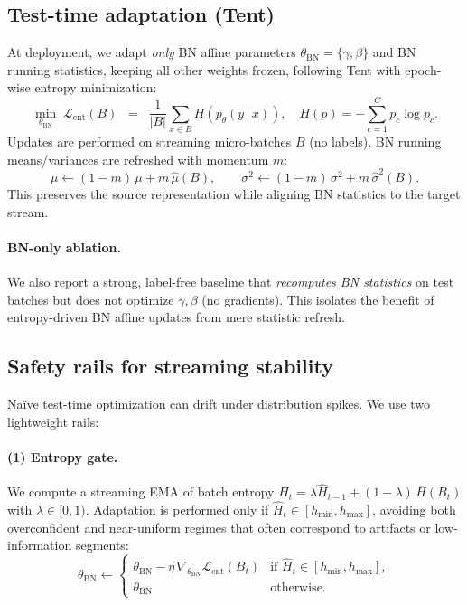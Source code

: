 \documentclass{article}
\begin{document}
\subsection{Test-time adaptation (Tent)}
At deployment, we adapt \emph{only} BN affine parameters $\theta_{\text{BN}}=\{\gamma,\beta\}$ and BN running statistics, keeping all other weights frozen, following Tent \citep{wang2021tent} with epoch-wise entropy minimization:
\[
\min_{\theta_{\text{BN}}} \; \mathcal{L}_{\text{ent}}(B) \;\;=\;\; \frac{1}{|B|}\sum_{x\in B} H\!\left(p_{\theta}(y\,|\,x)\right), 
\quad H(p) = -\sum_{c=1}^C p_c \log p_c.
\]
Updates are performed on streaming micro-batches $B$ (no labels). BN running means/variances are refreshed with momentum $m$:
\[
\mu \leftarrow (1-m)\,\mu + m\,\hat{\mu}(B),\qquad
\sigma^2 \leftarrow (1-m)\,\sigma^2 + m\,\hat{\sigma}^2(B).
\]
This preserves the source representation while aligning BN statistics to the target stream.

\paragraph{BN-only ablation.}
We also report a strong, label-free baseline that \emph{recomputes BN statistics} on test batches but does not optimize $\gamma,\beta$ (no gradients). This isolates the benefit of entropy-driven BN affine updates from mere statistic refresh.

\subsection{Safety rails for streaming stability}
Naïve test-time optimization can drift under distribution spikes. We use two lightweight rails:

\paragraph{(1) Entropy gate.}
We compute a streaming EMA of batch entropy $\hat{H}_t = \lambda \hat{H}_{t-1} + (1{-}\lambda)\,\overline{H}(B_t)$ with $\lambda\in[0,1)$. Adaptation is performed only if $\hat{H}_t \in [h_{\min},h_{\max}]$, avoiding both overconfident and near-uniform regimes that often correspond to artifacts or low‐information segments:
\[
\theta_{\text{BN}} \leftarrow 
\begin{cases}
\theta_{\text{BN}} - \eta \,\nabla_{\theta_{\text{BN}}}\mathcal{L}_{\text{ent}}(B_t) & \text{if } \hat{H}_t \in [h_{\min},h_{\max}],\\
\theta_{\text{BN}} & \text{otherwise.}
\end{cases}
\]
\end{document}
